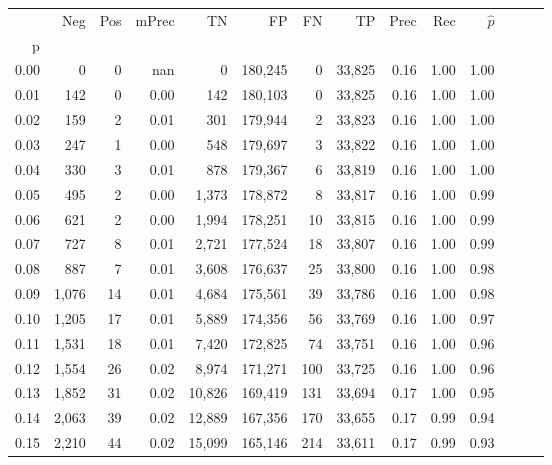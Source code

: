 \begin{tabular}{rrrrrrrrrrrrrr}
\toprule
{} &    Neg &  Pos & mPrec &       TN &       FP &      FN &      TP &  Prec &   Rec & $\hat{p}$ \\
p    &        &      &       &          &          &         &         &       &       &           \\
\midrule
0.00 &      0 &    0 &   nan &        0 &  180,245 &       0 &  33,825 &  0.16 &  1.00 &      1.00 \\
0.01 &    142 &    0 &  0.00 &      142 &  180,103 &       0 &  33,825 &  0.16 &  1.00 &      1.00 \\
0.02 &    159 &    2 &  0.01 &      301 &  179,944 &       2 &  33,823 &  0.16 &  1.00 &      1.00 \\
0.03 &    247 &    1 &  0.00 &      548 &  179,697 &       3 &  33,822 &  0.16 &  1.00 &      1.00 \\
0.04 &    330 &    3 &  0.01 &      878 &  179,367 &       6 &  33,819 &  0.16 &  1.00 &      1.00 \\
0.05 &    495 &    2 &  0.00 &    1,373 &  178,872 &       8 &  33,817 &  0.16 &  1.00 &      0.99 \\
0.06 &    621 &    2 &  0.00 &    1,994 &  178,251 &      10 &  33,815 &  0.16 &  1.00 &      0.99 \\
0.07 &    727 &    8 &  0.01 &    2,721 &  177,524 &      18 &  33,807 &  0.16 &  1.00 &      0.99 \\
0.08 &    887 &    7 &  0.01 &    3,608 &  176,637 &      25 &  33,800 &  0.16 &  1.00 &      0.98 \\
0.09 &  1,076 &   14 &  0.01 &    4,684 &  175,561 &      39 &  33,786 &  0.16 &  1.00 &      0.98 \\
0.10 &  1,205 &   17 &  0.01 &    5,889 &  174,356 &      56 &  33,769 &  0.16 &  1.00 &      0.97 \\
0.11 &  1,531 &   18 &  0.01 &    7,420 &  172,825 &      74 &  33,751 &  0.16 &  1.00 &      0.96 \\
0.12 &  1,554 &   26 &  0.02 &    8,974 &  171,271 &     100 &  33,725 &  0.16 &  1.00 &      0.96 \\
0.13 &  1,852 &   31 &  0.02 &   10,826 &  169,419 &     131 &  33,694 &  0.17 &  1.00 &      0.95 \\
0.14 &  2,063 &   39 &  0.02 &   12,889 &  167,356 &     170 &  33,655 &  0.17 &  0.99 &      0.94 \\
0.15 &  2,210 &   44 &  0.02 &   15,099 &  165,146 &     214 &  33,611 &  0.17 &  0.99 &      0.93 \\

\end{tabular}
